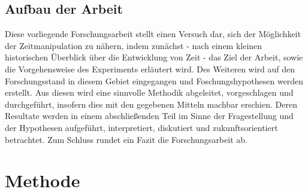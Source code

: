 \documentclass{Paper}
\begin{document}
\subsection{Aufbau der Arbeit}
Diese vorliegende Forschungsarbeit stellt einen Versuch dar, sich der Möglichkeit der Zeitmanipulation zu nähern,  indem zunächst - nach einem kleinen historischen Überblick über die Entwicklung von Zeit - das Ziel der Arbeit, sowie die Vorgehensweise des Experiments erläutert wird. Des Weiteren wird auf den Forschungsstand in diesem Gebiet eingegangen und Foschungshypothesen werden erstellt. Aus diesen wird eine sinnvolle Methodik abgeleitet, vorgeschlagen und durchgeführt, insofern dies mit den gegebenen Mitteln machbar erschien. Deren Resultate werden in einem abschließenden Teil im Sinne der Fragestellung und der Hypothesen aufgeführt, interpretiert, diskutiert und zukunftsorientiert betrachtet. Zum Schluss rundet ein Fazit die Forschungsarbeit ab. 


 
	
\section{Methode}
\end{document}
